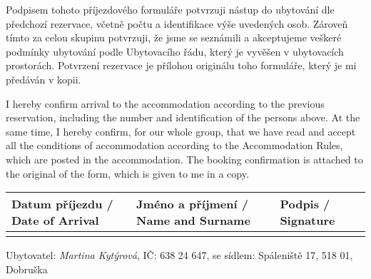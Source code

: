 \documentclass[a4paper,landscape,10pt]{scrartcl}
\begin{document}
\begin{description}[leftmargin=0pt]
    \item[Prohlášení]
    Podpisem tohoto příjezdového formuláře potvrzuji nástup do ubytování dle předchozí rezervace, včetně počtu a identifikace výše uvedených osob. Zároveň tímto za
    celou skupinu potvrzuji, že jsme se seznámili a akceptujeme veškeré podmínky ubytování podle Ubytovacího řádu, který je vyvěšen v ubytovacích prostorách. Potvrzení
    rezervace je přílohou originálu toho formuláře, který je mi předáván v kopii.

    I hereby confirm arrival to the accommodation according to the previous reservation, including the number and identification of the persons above. At the same time,
    I hereby confirm, for our whole group, that we have read and accept all the conditions of accommodation according to the Accommodation Rules, which are posted in
    the accommodation. The booking confirmation is attached to the original of the form, which is given to me in a copy.

    \def\arraystretch{2}
    \begin{tabularx}{\linewidth}{
        |>{\hsize=1\hsize}X|>{\hsize=1\hsize}X|>{\hsize=1\hsize}X|}
        \hline
    
        Datum příjezdu / Date of Arrival & Jméno a příjmení / Name and Surname & Podpis / Signature \\
        \hline && \\
        \hline
    \end{tabularx}
\end{description}


\begin{center}
    Ubytovatel: \emph{Martina Kytýrová}, IČ: 638 24 647, se sídlem: Spáleniště 17, 518 01, Dobruška
\end{center}
\end{document}
